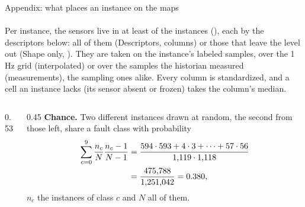 \begin{frame}[label=instances]{Appendix: what places an instance on the maps}
  \framesubtitle{\isquestion}
  {\scriptsize\color{ws3wbrown} Per instance, the \isSensors{} sensors live in at least \isCoverage{}
  of the instances (\isSensorList), each by the descriptors below: all of them (Descriptors,
  \isColumns{} columns) or those that leave the level out (Shape only, \isShapeColumns). They are
  taken on the instance's labeled samples, over the 1\,Hz grid (interpolated) or over the samples
  the historian measured (measurements), the sampling ones alike. Every column is standardized, and
  a cell an instance lacks (its sensor absent or frozen) takes the column's median.\par}
  \vskip 2mm
  \begin{columns}[T]
    \begin{column}{0.53\textwidth}
      \centering\scriptsize\setlength{\tabcolsep}{2.4pt}
      \def\arraystretch{1.25}
      
    \end{column}
    \begin{column}{0.45\textwidth}
      \scriptsize
      \textbf{Chance.} Two different instances drawn at random, the second from those left,
      share a fault class with probability
      \begin{align*}
        \sum_{c=0}^{9} \frac{n_c}{N} \frac{n_c-1}{N-1}
          &= \frac{\text{594} \cdot \text{593} + \text{4} \cdot \text{3} + \dots + \text{57} \cdot \text{56}}{\text{1,119} \cdot \text{1,118}} \\
          &= \frac{\text{475,788}}{\text{1,251,042}} = \text{0.380},
      \end{align*}
      \(n_c\) the instances of class \(c\) and \(N\) all of them.
    \end{column}
  \end{columns}
\end{frame}

